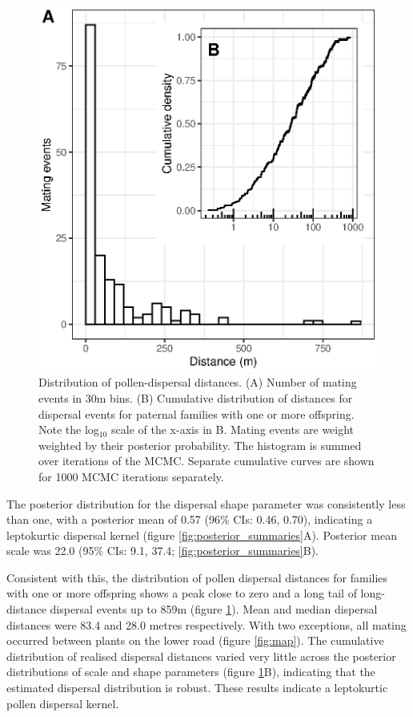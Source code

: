 \documentclass[10pt, a4paper, twocolumn]{article} %
\begin{document}
\begin{figure}
    \centering
    \includegraphics{fig-dispersal.eps}
    \caption{
        Distribution of pollen-dispersal distances.
        (A) Number of mating events in 30m bins.
        (B) Cumulative distribution of distances for dispersal events for paternal families with one or more offspring.
        Note the log$_{10}$ scale of the x-axis in B.
        Mating events are weight weighted by their posterior probability.
        The histogram is summed over iterations of the MCMC.
        Separate cumulative curves are shown for 1000 MCMC iterations separately.
    }
    \label{fig:dispersal}
\end{figure}

The posterior distribution for the dispersal shape parameter was consistently less than one, with a posterior mean of 0.57 (96\% CIs: 0.46, 0.70), indicating a leptokurtic dispersal kernel (figure \ref{fig:posterior_summaries}A).
Posterior mean scale was 22.0 (95\% CIs: 9.1, 37.4; \ref{fig:posterior_summaries}B).

Consistent with this, the distribution of pollen dispersal distances for families with one or more offspring shows a peak close to zero and a long tail of long-distance dispersal events up to 859m (figure \ref{fig:dispersal}).
Mean and median dispersal distances were 83.4 and 28.0 metres respectively.
With two exceptions, all mating occurred between plants on the lower road (figure \ref{fig:map}).
The cumulative distribution of realised dispersal distances varied very little across the posterior distributions of scale and shape parameters (figure \ref{fig:dispersal}B), indicating that the estimated dispersal distribution is robust.
These results indicate a leptokurtic pollen dispersal kernel.
\end{document}
